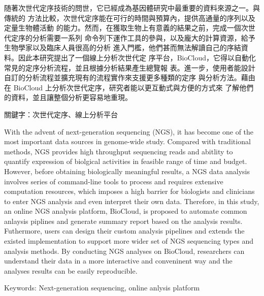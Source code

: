 \begin{abstractzh}
随著次世代定序技術的問世，它已經成為基因體研究中最重要的資料來源之一。與傳統的
方法比較，次世代定序能在可行的時間與預算內，提供高通量的序列以及定量生物體活動
的能力。然而，在獲取生物上有意義的結果之前，完成一個次世代定序的分析需要一系列
命令列下運作工具的參與，以及龐大的計算資源，給予生物學家以及臨床人員很高的分析
進入門檻，他們甚而無法解讀自己的序結資料。因此本研究提出了一個線上分析次世代定
序平台，BioCloud，它得以自動化常見的定序分析流程，並且根據分析結果產生總覽報
表。進一步，使用者能設計自訂的分析流程並擴充現有的流程實作來支援更多種類的定序
與分析方法。藉由在 BioCloud 上分析次世代定序，研究者能以更互動式與方便的方式來
了解他們的資料，並且讓整個分析更容易地重現。

\vspace{1.5em}\noindent
關鍵字：次世代定序、線上分析平台
\end{abstractzh}

\begin{abstracten}

With the advent of next-generation sequencing (NGS), it has become one of the
most important data sources in genome-wide study. Compared with traditional
methods, NGS provides high throughput sequencing reads and abitlity to quantify
expression of biolgical activities in feasible range of time and budget.
However, before obtaining biologically meaningful results, a NGS data analysis
involves series of command-line tools to process and requires extensive
computation resources, which imposes a high barrier for biologists and
clinicians to enter NGS analysis and even interpret their own data. Therefore,
in this study, an online NGS analysis platform, BioCloud, is proposed to
automate common anlaysis piplines and generate summary report based on the
analysis results. Futhermore, users can design their custom analysis pipelines
and extends the existed implementation to support more wider set of NGS
sequencing types and analysis methods. By conducting NGS analyses on BioCloud,
researchers can understand their data in a more interactive and conveninent way
and the analyses results can be easily reproducible.

\vspace{2em}\noindent
Keywords: Next-generation sequencing, online anlysis platform
\end{abstracten}

